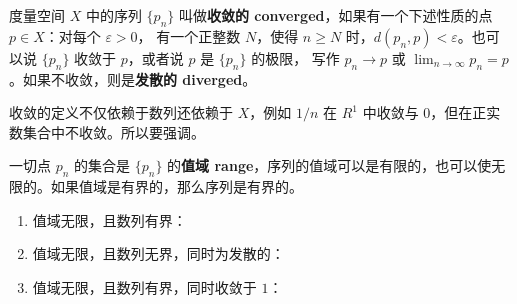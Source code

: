 \documentclass[../poma-notes.tex]{subfiles}
\begin{document}
\begin{anote}
  度量空间 $X$ 中的序列 $\{p_n\}$ 叫做\textbf{收敛的 converged}，如果有一个下述性质的点 $p \in X$：对每个 $\varepsilon>0$，
  有一个正整数 $N$，使得 $n \ge N$ 时，$d(p_n,p)<\varepsilon$。也可以说 $\{p_n\}$ 收敛于 $p$，或者说 $p$ 是 $\{p_n\}$ 的极限，
  写作 $p_n \to p$ 或 $\lim_{n \to \infty} p_n = p$。如果不收敛，则是\textbf{发散的 diverged}。

  收敛的定义不仅依赖于数列还依赖于 $X$，例如 ${1/n}$ 在 $R^1$ 中收敛与 $0$，但在正实数集合中不收敛。所以要强调。

  一切点 $p_n$ 的集合是 $\{p_n\}$ 的\textbf{值域 range}，序列的值域可以是有限的，也可以使无限的。如果值域是有界的，那么序列是有界的。

  \begin{enumerate}[label=(\alph*)]
    \item 值域无限，且数列有界：
          \begin{center}
          \end{center}
    \item 值域无限，且数列无界，同时为发散的：
          \begin{center}
          \end{center}
    \item 值域无限，且数列有界，同时收敛于 $1$：

\end{enumerate}
\end{anote}
\end{document}
